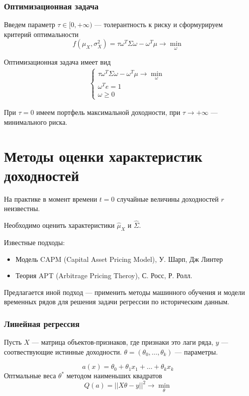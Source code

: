 \documentclass{beamer}
\begin{document}
\begin{frame}
    \frametitle{Оптимизационная задача}
    Введем параметр $\tau \in [0, +\infty)$ --- толерантность к риску и сформурируем критерий оптимальности
    \[ 
        f(\mu_X, \sigma_X^2) = \tau \omega^T \Sigma \omega - \omega^T \mu \rightarrow \min_{\omega}
    \]

    Оптимизационная задача имеет вид
    \begin{align*}
        \begin{cases}
            \tau \omega^T \Sigma \omega - \omega^T \mu \rightarrow \min_{\omega} \\
            \omega^T e = 1 \\
            \omega \ge 0
        \end{cases}
    \end{align*}

    При $\tau=0$ имеем портфель максимальной доходности, при $\tau \rightarrow +\infty$
    --- минимального риска.
\end{frame}

\section{Методы оценки характеристик доходностей}

\begin{frame}
    На практике в момент времени $t=0$ случайные величины доходностей $r$ неизвестны.
    
    Необходимо оценить характеристики $\hat{\mu}_X$ и $\hat{\Sigma}$.

    Известные подходы:
    \begin{itemize}
        \item Модель CAPM (Capital Asset Pricing Model), У. Шарп, Дж Линтер
        \item Теория  APT (Arbitrage Pricing Theroy), С. Росс, Р. Ролл.
    \end{itemize}
    
    Предлагается иной подход --- применить методы машинного обучения и модели временных
    рядов для решения задачи регрессии по историческим данным.
\end{frame}

\begin{frame}
    \frametitle{Линейная регрессия}
    Пусть $X$ --- матрица объектов-признаков, где признаки это лаги ряда,
    $y$ --- соотвествующие истинные доходности.
    $\theta = (\theta_0, \dots, \theta_k)$ --- параметры.
    
    \[
        a(x) = \theta_0 + \theta_1 x_1 + \dots + \theta_k x_k
    \]
    Оптмальные веса $\theta^*$ методом наименьших квадратов
    \[
        Q(a) = || X\theta - y||^2 \rightarrow \min_{\theta}
    \]
\end{frame}
\end{document}
